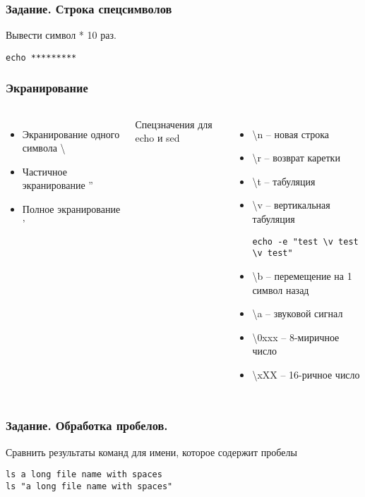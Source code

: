 \begin{frame}[fragile]
	\frametitle{Задание. Строка спецсимволов}
Вывести символ * 10 раз.
				\begin{lstlisting}
echo *********
				\end{lstlisting}
\end{frame}

\begin{frame}[fragile]
	\frametitle{Экранирование}

	\begin{columns}
		\begin{itemize}
			\item Экранирование одного символа \textbackslash 
			\item Частичное экранирование ''
			\item Полное экранирование '
		\end{itemize}
		\pause
		Спецзначения для echo и sed
		\begin{itemize}
			\item \textbackslash{n} -- новая строка
			\item \textbackslash{r} -- возврат каретки
			\item \textbackslash{t} -- табуляция
			\item \textbackslash{v} -- вертикальная табуляция \\
				\small\begin{lstlisting}
echo -e "test \v test \v test"
				\end{lstlisting}
			\item \textbackslash{b} -- перемещение на 1 символ назад
			\item \textbackslash{a} -- звуковой сигнал
			\item \textbackslash{0xxx} -- 8-миричное число
			\item \textbackslash{xXX} -- 16-ричное число
		\end{itemize}
	\end{columns}

\end{frame}

\begin{frame}[fragile]
	\frametitle{Задание. Обработка пробелов.}
Сравнить результаты команд для имени, которое содержит пробелы
				\begin{lstlisting}
ls a long file name with spaces
ls "a long file name with spaces" 
				\end{lstlisting}
\end{frame}

